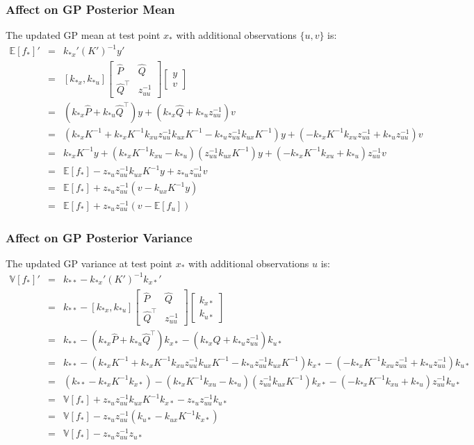 \documentclass[a4paper,10pt]{article}
\newcommand{\inv}{^{-1}}
\newcommand{\E}{\mathbb{E}}
\newcommand{\V}{\mathbb{V}}
\newcommand{\nnn}{\nonumber \\}
\begin{document}
\subsubsection{Affect on GP Posterior Mean}\label{sec:affectmean}
The updated GP mean at test point $x_*$ with additional observations $\{u,v\}$ is:
\begin{eqnarray}
 \E[f_*]'
 & = & k_{*x}'(K')\inv y' \nnn
 & = & [k_{*x}, k_{*u}] \begin{bmatrix} \hat{P} & \hat{Q} \\  \hat{Q}^{\top} & z_{uu}\inv  \end{bmatrix} \begin{bmatrix} y \\ v \end{bmatrix} \nnn
 & = & (k_{*x}\hat{P} + k_{*u}\hat{Q}^{\top})y + (k_{*x}\hat{Q} + k_{*u}z_{uu}\inv )v \nnn
 & = & (k_{*x}K\inv  + k_{*x}K\inv k_{xu} z_{uu}\inv  k_{ux}K\inv  - k_{*u}z_{uu}\inv k_{ux}K\inv )y + (-k_{*x}K\inv k_{xu} z_{uu}\inv  + k_{*u}z_{uu}\inv )v \nnn
 & = & k_{*x}K\inv y + (k_{*x}K\inv k_{xu} - k_{*u})(z_{uu}\inv k_{ux}K\inv )y + (-k_{*x}K\inv k_{xu} + k_{*u})z_{uu}\inv v \nnn
 & = & \E[f_*] - z_{*u}z_{uu}\inv k_{ux}K\inv y + z_{*u}z_{uu}\inv v \nnn
 & = & \E[f_*] + z_{*u}z_{uu}\inv (v - k_{ux}K\inv y) \nnn
 & = & \E[f_*] + z_{*u}z_{uu}\inv (v - \E[f_u])\label{eq:affectmean}
\end{eqnarray}

\subsubsection{Affect on GP Posterior Variance}\label{sec:affectvar}
The updated GP variance at test point $x_*$ with additional observations $u$ is:
\begin{eqnarray}
 \V[f_*]'
 & = & k_{**} - k_{*x}'(K')\inv k_{x*}' \nnn
 & = & k_{**} - [k_{*x}, k_{*u}] \begin{bmatrix}\hat{P} & \hat{Q} \\ \hat{Q}^{\top} & z_{uu}\inv \end{bmatrix} \begin{bmatrix}k_{x*} \\ k_{u*}\end{bmatrix} \nnn
 & = & k_{**} - (k_{*x}\hat{P} + k_{*u}\hat{Q}^{\top})k_{x*} - (k_{*x}\hat{Q} + k_{*u}z_{uu}\inv )k_{u*} \nnn
 & = & k_{**} - (k_{*x}K\inv  + k_{*x}K\inv k_{xu} z_{uu}\inv  k_{ux}K\inv  - k_{*u}z_{uu}\inv k_{ux}K\inv )k_{x*} - (-k_{*x}K\inv k_{xu} z_{uu}\inv  + k_{*u}z_{uu}\inv )k_{u*} \nnn
 & = & (k_{**} - k_{*x}K\inv k_{x*}) - (k_{*x}K\inv k_{xu} - k_{*u})(z_{uu}\inv k_{ux}K\inv )k_{x*} - (-k_{*x}K\inv k_{xu} + k_{*u})z_{uu}\inv k_{u*} \nnn
 & = & \V[f_*] + z_{*u}z_{uu}\inv k_{ux}K\inv k_{x*} - z_{*u}z_{uu}\inv k_{u*} \nnn
 & = & \V[f_*] - z_{*u}z_{uu}\inv (k_{u*} - k_{ux}K\inv k_{x*}) \nnn
 & = & \V[f_*] - z_{*u}z_{uu}\inv z_{u*}\label{eq:affectvar}
\end{eqnarray}
\end{document}
